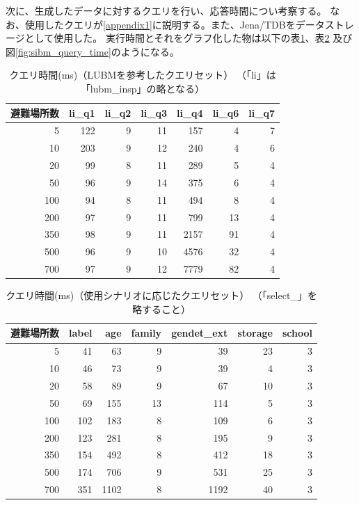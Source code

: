 次に、生成したデータに対するクエリを行い、応答時間につい考察する。
なお、使用したクエリが\ref{appendix1}に説明する。また、Jena/TDBをデータストレージとして使用した。
実行時間とそれをグラフ化した物は以下の表\ref{table:sibm_query_time_1}、表\ref{table:sibm_query_time_2}
及び図\ref{fig:sibm_query_time}のようになる。

\begin{table}[h!]
	\begin{center}
	\begin{tabular}{| r | r | r | r | r | r | r |}
		\hline
		\rowstyle{\bfseries}
		避難場所数 & li\_q1 & li\_q2 & li\_q3 & li\_q4 &
		li\_q6 & li\_q7 \\
		\hline
		5 & 122 & 9 & 11 & 157 & 4 & 7 \\
		\hline
		10 & 203 & 9 & 12 & 240 & 4 & 6 \\
		\hline
		20 & 99 & 8 & 11 & 289 & 5 & 4 \\
		\hline
		50 & 96 & 9 & 14 & 375 & 6 & 4 \\
		\hline
		100 & 94 & 8 & 11 & 494 & 8 & 4 \\
		\hline
		200 & 97 & 9 & 11 & 799 & 13 & 4 \\
		\hline
		350 & 98 & 9 & 11 & 2157 & 91 & 4 \\
		\hline
		500 & 96 & 9 & 10 & 4576 & 32 & 4 \\
		\hline
		700 & 97 & 9 & 12 & 7779 & 82 & 4 \\
		\hline
	\end{tabular}
	\caption{クエリ時間(ms)（LUBMを参考したクエリセット）
	（「li」は「lubm\_insp」の略となる）}
	\label{table:sibm_query_time_1}
	\end{center}
\end{table}

\begin{table}[h!]
	\begin{center}
	\begin{tabular}{| r | r | r | r | r | r | r |}
		\hline
		\rowstyle{\bfseries}
		避難場所数 & label & age & family & gendet\_ext &
		storage & school \\
		\hline
		5 & 41 & 63 & 9 & 39 & 23 & 3 \\
		\hline
		10 & 46 & 73 & 9 & 39 & 4 & 3 \\
		\hline
		20 & 58 & 89 & 9 & 67 & 10 & 3 \\
		\hline
		50 & 69 & 155 & 13 & 114 & 5 & 3 \\
		\hline
		100 & 102 & 183 & 8 & 109 & 6 & 3 \\
		\hline
		200 & 123 & 281 & 8 & 195 & 9 & 3 \\
		\hline
		350 & 154 & 492 & 8 & 412 & 18 & 3 \\
		\hline
		500 & 174 & 706 & 9 & 531 & 25 & 3 \\
		\hline
		700 & 351 & 1102 & 8 & 1192 & 40 & 3 \\
		\hline
	\end{tabular}
	\caption{クエリ時間(ms)（使用シナリオに応じたクエリセット）
	（「select\_」を略すること）}
	\label{table:sibm_query_time_2}
	\end{center}
\end{table}

